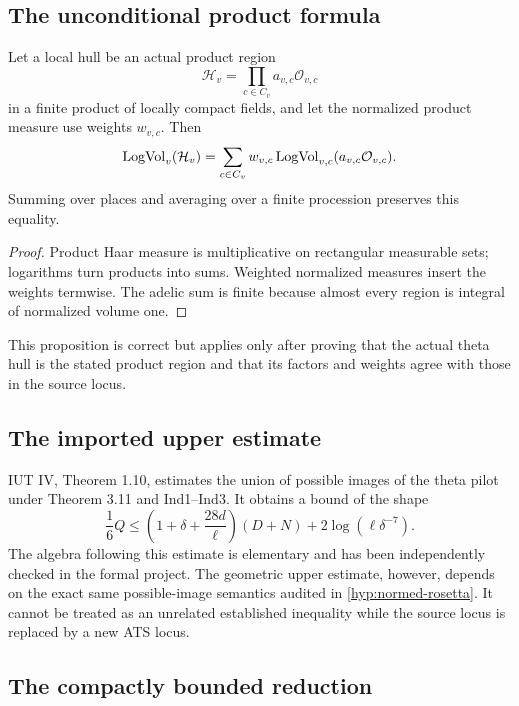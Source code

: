 
\subsection{The unconditional product formula}

\begin{proposition}\label{prop:component-volume}
Let a local hull be an actual product region
\[
 \mathcal H_v=\prod_{c\in C_v}a_{v,c}\mathcal O_{v,c}
\]
in a finite product of locally compact fields, and let the normalized product measure use weights $w_{v,c}$.  Then
\[
 \operatorname{LogVol}_v(\mathcal H_v)
 =\sum_{c\in C_v}w_{v,c}
   \operatorname{LogVol}_{v,c}(a_{v,c}\mathcal O_{v,c}).
\]
Summing over places and averaging over a finite procession preserves this equality.
\end{proposition}

\begin{proof}
Product Haar measure is multiplicative on rectangular measurable sets; logarithms turn products into sums.  Weighted normalized measures insert the weights termwise.  The adelic sum is finite because almost every region is integral of normalized volume one.
\end{proof}

This proposition is correct but applies only after proving that the actual theta hull is the stated product region and that its factors and weights agree with those in the source locus.

\subsection{The imported upper estimate}

IUT IV, Theorem 1.10, estimates the union of possible images of the theta pilot under Theorem 3.11 and Ind1--Ind3.  It obtains a bound of the shape
\[
 \frac16Q\le
 \left(1+\delta+\frac{28d}{\ell}\right)(D+N)
 +2\log(\ell\delta^{-7}).
\]
The algebra following this estimate is elementary and has been independently checked in the formal project.  The geometric upper estimate, however, depends on the exact same possible-image semantics audited in \cref{hyp:normed-rosetta}.  It cannot be treated as an unrelated established inequality while the source locus is replaced by a new ATS locus.

\subsection{The compactly bounded reduction}

